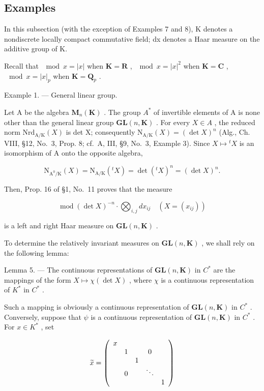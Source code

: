\subsection{Examples}

In this subsection (with the exception of Examples 7 and 8), K denotes a nondiscrete locally compact commutative field; dx denotes a Haar measure on the additive group of K.

Recall that \(\mod x = |x|\) when \(\mathbf{K} = \mathbf{R}\) , \(\mod x = |x|^2\) when \(\mathbf{K} = \mathbf{C}\) , \(\mod x = |x|_p\) when \(\mathbf{K} = \mathbf{Q}_p\) .

Example 1. --- General linear group.

Let A be the algebra \(\mathbf{M}_{n}(\mathbf{K})\) . The group \(A^{*}\) of invertible elements of A is none other than the general linear group \(\mathbf{GL}(n,\mathbf{K})\) . For every \(X\in A\) , the reduced norm \(\mathrm{Nrd}_{\mathrm{A}/\mathrm{K}}(X)\) is det X; consequently \(\mathrm{N}_{\mathrm{A}/\mathrm{K}}(X)=(\det X)^{n}\) (Alg., Ch. VIII, §12, No.~3, Prop. 8; cf.~A, III, §9, No.~3, Example 3). Since \(X\mapsto{}^{t}X\) is an isomorphism of A onto the opposite algebra,

\[
\mathrm{N} _ {\mathrm{A} ^ {0} / \mathrm{K}} (X) = \mathrm{N} _ {\mathrm{A} / \mathrm{K}} (^ {t} X) = \det (^ {t} X) ^ {n} = (\det X) ^ {n}.
\]

Then, Prop. 16 of §1, No.~11 proves that the measure

\[
\operatorname{mod} (\det X) ^ {- n} \cdot \bigotimes_ {i, j} d x _ {i j} \quad (X = (x _ {i j}))\tag{3}
\]

is a left and right Haar measure on \(\mathbf{GL}(n,\mathbf{K})\) .

To determine the relatively invariant measures on \(\mathbf{GL}(n,\mathbf{K})\) , we shall rely on the following lemma:

Lemma 5. --- The continuous representations of \(\mathbf{GL}(n,\mathbf{K})\) in \(C^{*}\) are the mappings of the form \(X \mapsto \chi(\det X)\) , where \(\chi\) is a continuous representation of \(K^{*}\) in \(C^{*}\) .

Such a mapping is obviously a continuous representation of \(\mathbf{GL}(n,\mathbf{K})\) in \(C^{*}\) . Conversely, suppose that \(\psi\) is a continuous representation of \(\mathbf{GL}(n,\mathbf{K})\) in \(C^{*}\) . For \(x \in K^{*}\) , set

\[
\widetilde {x} = \left( \begin{array}{c c c c c} x & & & & \\ & 1 & & 0 & \\ & & 1 & & \\ & 0 & & \ddots & \\ & & & & 1 \end{array} \right)
\]

